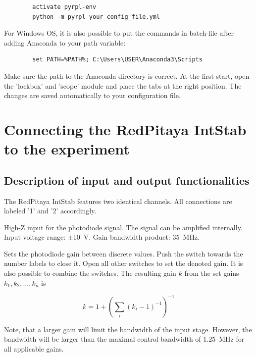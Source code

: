 \documentclass[twoside,a4paper]{refart}
\begin{document}
\begin{tcolorbox}
	\begin{verbatim}
		activate pyrpl-env
		python -m pyrpl your_config_file.yml
	\end{verbatim}
\end{tcolorbox}

For Windows OS, it is also possible to put the commands in batch-file after adding Anaconda to your path variable:

\begin{tcolorbox}
	\begin{verbatim}
		set PATH=%PATH%; C:\Users\USER\Anaconda3\Scripts
	\end{verbatim}
\end{tcolorbox}

Make sure the path to the Anaconda directory is correct. At the first start, open the 'lockbox' and 'scope' module and place the tabs at the right position. The changes are saved automatically to your configuration file.

\section{Connecting the RedPitaya IntStab to the experiment}

\subsection{Description of input and output functionalities}
The RedPitaya IntStab features two identical channels. All connections are labeled '1' and '2' accordingly. 

High-Z input for the photodiode signal. The signal can be amplified internally. Input voltage range:  $\pm$\SI{10}{\volt}. Gain bandwidth product: \SI{35}{\mega\hertz}.


Sets the photodiode gain between discrete values. Push the switch towards the number labels to close it. Open all other switches to set the denoted gain. It is also possible to combine the switches. The resulting gain $k$ from the set gains $k_1, k_2, \dots, k_n$ is


	$$k = 1+ \left(\sum_i(k_i -1)^{-1}\right)^{-1}$$
	
Note, that a larger gain will limit the bandwidth of the input stage. However, the bandwidth will be larger than the maximal control bandwidth of \SI{1.25}{\mega\hertz} for all applicable gains. 
\end{document}

